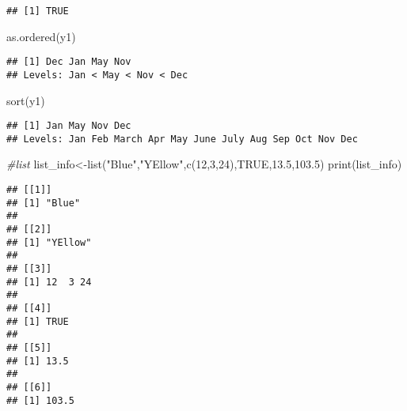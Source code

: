 \documentclass[
]{article}
\newenvironment{Shaded}{\begin{snugshade}}{\end{snugshade}}
\newcommand{\CommentTok}[1]{\textcolor[rgb]{0.56,0.35,0.01}{\textit{#1}}}
\newcommand{\ConstantTok}[1]{\textcolor[rgb]{0.00,0.00,0.00}{#1}}
\newcommand{\DecValTok}[1]{\textcolor[rgb]{0.00,0.00,0.81}{#1}}
\newcommand{\FloatTok}[1]{\textcolor[rgb]{0.00,0.00,0.81}{#1}}
\newcommand{\FunctionTok}[1]{\textcolor[rgb]{0.00,0.00,0.00}{#1}}
\newcommand{\NormalTok}[1]{#1}
\newcommand{\OtherTok}[1]{\textcolor[rgb]{0.56,0.35,0.01}{#1}}
\newcommand{\StringTok}[1]{\textcolor[rgb]{0.31,0.60,0.02}{#1}}
\begin{document}
\begin{verbatim}
## [1] TRUE
\end{verbatim}

\begin{Shaded}
\begin{Highlighting}[]
\FunctionTok{as.ordered}\NormalTok{(y1)}
\end{Highlighting}
\end{Shaded}

\begin{verbatim}
## [1] Dec Jan May Nov
## Levels: Jan < May < Nov < Dec
\end{verbatim}

\begin{Shaded}
\begin{Highlighting}[]
\FunctionTok{sort}\NormalTok{(y1)}
\end{Highlighting}
\end{Shaded}

\begin{verbatim}
## [1] Jan May Nov Dec
## Levels: Jan Feb March Apr May June July Aug Sep Oct Nov Dec
\end{verbatim}

\begin{Shaded}
\begin{Highlighting}[]
\CommentTok{\#list}
\NormalTok{list\_info}\OtherTok{\textless{}{-}}\FunctionTok{list}\NormalTok{(}\StringTok{"Blue"}\NormalTok{,}\StringTok{"YEllow"}\NormalTok{,}\FunctionTok{c}\NormalTok{(}\DecValTok{12}\NormalTok{,}\DecValTok{3}\NormalTok{,}\DecValTok{24}\NormalTok{),}\ConstantTok{TRUE}\NormalTok{,}\FloatTok{13.5}\NormalTok{,}\FloatTok{103.5}\NormalTok{)}
\FunctionTok{print}\NormalTok{(list\_info)}
\end{Highlighting}
\end{Shaded}

\begin{verbatim}
## [[1]]
## [1] "Blue"
## 
## [[2]]
## [1] "YEllow"
## 
## [[3]]
## [1] 12  3 24
## 
## [[4]]
## [1] TRUE
## 
## [[5]]
## [1] 13.5
## 
## [[6]]
## [1] 103.5
\end{verbatim}
\end{document}
